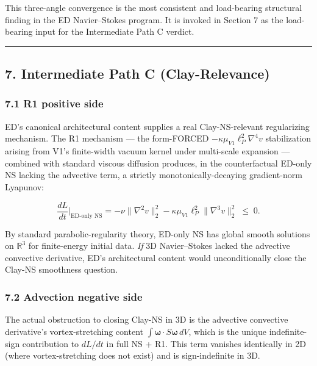 \documentclass[
  11pt,a4paper]{article}
\begin{document}
This three-angle convergence is the most consistent and load-bearing
structural finding in the ED Navier--Stokes program. It is invoked in
Section 7 as the load-bearing input for the Intermediate Path C verdict.

\begin{center}\rule{0.5\linewidth}{0.5pt}\end{center}

\subsection{7. Intermediate Path C
(Clay-Relevance)}\label{intermediate-path-c-clay-relevance}

\subsubsection{7.1 R1 positive side}\label{r1-positive-side}

ED's canonical architectural content supplies a real Clay-NS-relevant
regularizing mechanism. The R1 mechanism --- the form-FORCED
\(-\kappa\mu_{V1}\ell_P^2\nabla^4 v\) stabilization arising from V1's
finite-width vacuum kernel under multi-scale expansion --- combined with
standard viscous diffusion produces, in the counterfactual ED-only NS
lacking the advective term, a strictly monotonically-decaying
gradient-norm Lyapunov:

\[\frac{dL}{dt}\bigg|_\text{ED-only NS} = -\nu\|\nabla^2 v\|_2^2 - \kappa\mu_{V1}\ell_P^2 \|\nabla^3 v\|_2^2 \;\le\; 0.\]

By standard parabolic-regularity theory, ED-only NS has global smooth
solutions on \(\mathbb{R}^3\) for finite-energy initial data. \emph{If}
3D Navier--Stokes lacked the advective convective derivative, ED's
architectural content would unconditionally close the Clay-NS smoothness
question.

\subsubsection{7.2 Advection negative
side}\label{advection-negative-side}

The actual obstruction to closing Clay-NS in 3D is the advective
convective derivative's vortex-stretching content
\(\int \boldsymbol{\omega} \cdot S\boldsymbol{\omega} \, dV\), which is
the unique indefinite-sign contribution to \(dL/dt\) in full NS + R1.
This term vanishes identically in 2D (where vortex-stretching does not
exist) and is sign-indefinite in 3D.
\end{document}
